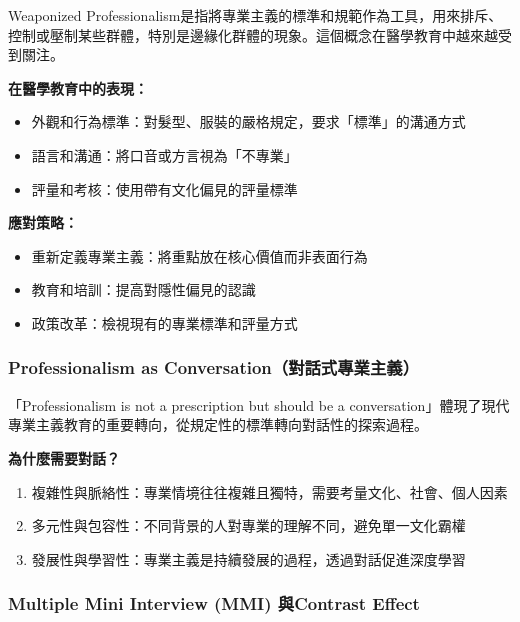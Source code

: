 \documentclass[12pt,a4paper]{article}
\begin{document}
Weaponized Professionalism是指將專業主義的標準和規範作為工具，用來排斥、控制或壓制某些群體，特別是邊緣化群體的現象。這個概念在醫學教育中越來越受到關注。

\textbf{在醫學教育中的表現：}
\begin{itemize}[nosep]
    \item 外觀和行為標準：對髮型、服裝的嚴格規定，要求「標準」的溝通方式
    \item 語言和溝通：將口音或方言視為「不專業」
    \item 評量和考核：使用帶有文化偏見的評量標準
\end{itemize}

\textbf{應對策略：}
\begin{itemize}[nosep]
    \item 重新定義專業主義：將重點放在核心價值而非表面行為
    \item 教育和培訓：提高對隱性偏見的認識
    \item 政策改革：檢視現有的專業標準和評量方式
\end{itemize}

\subsubsection{Professionalism as Conversation（對話式專業主義）}

「Professionalism is not a prescription but should be a conversation」體現了現代專業主義教育的重要轉向，從規定性的標準轉向對話性的探索過程。

\textbf{為什麼需要對話？}
\begin{enumerate}
    \item 複雜性與脈絡性：專業情境往往複雜且獨特，需要考量文化、社會、個人因素
    \item 多元性與包容性：不同背景的人對專業的理解不同，避免單一文化霸權
    \item 發展性與學習性：專業主義是持續發展的過程，透過對話促進深度學習
\end{enumerate}

\subsubsection{Multiple Mini Interview (MMI) 與Contrast Effect}
\end{document}
